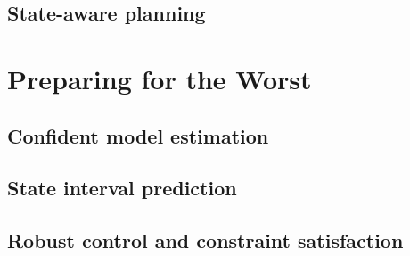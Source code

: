 \section{State-aware planning}
\chapter{Preparing for the Worst}
\section{Confident model estimation}
\section{State interval prediction}
\section{Robust control and constraint satisfaction}

